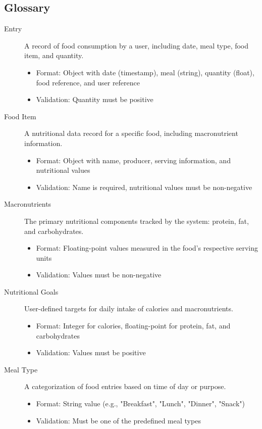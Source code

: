 \documentclass[a4paper,10pt]{article}
\begin{document}
    \subsection{Glossary}
    \begin{description}
    \item[Entry] A record of food consumption by a user, including date, meal type, food item, and quantity.
        \begin{itemize}
            \item Format: Object with date (timestamp), meal (string), quantity (float), food reference, and user reference
            \item Validation: Quantity must be positive
        \end{itemize}

    \item[Food Item] A nutritional data record for a specific food, including macronutrient information.
        \begin{itemize}
            \item Format: Object with name, producer, serving information, and nutritional values
            \item Validation: Name is required, nutritional values must be non-negative
        \end{itemize}

    \item[Macronutrients] The primary nutritional components tracked by the system: protein, fat, and carbohydrates.
        \begin{itemize}
            \item Format: Floating-point values measured in the food's respective serving units
            \item Validation: Values must be non-negative
        \end{itemize}

    \item[Nutritional Goals] User-defined targets for daily intake of calories and macronutrients.
        \begin{itemize}
            \item Format: Integer for calories, floating-point for protein, fat, and carbohydrates
            \item Validation: Values must be positive
        \end{itemize}

    \item[Meal Type] A categorization of food entries based on time of day or purpose.
    \begin{itemize}
        \item Format: String value (e.g., "Breakfast", "Lunch", "Dinner", "Snack")
        \item Validation: Must be one of the predefined meal types
    \end{itemize}


\end{description}
\end{document}
